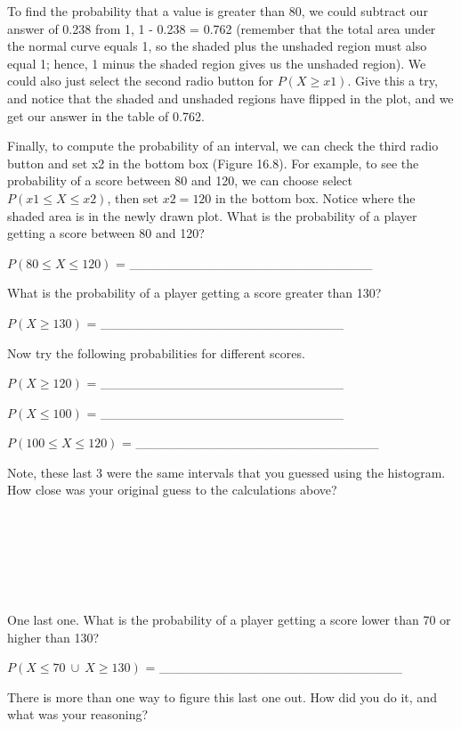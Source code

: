 \documentclass[
]{scrbook}
\begin{document}
To find the probability that a value is greater than 80, we could subtract our answer of 0.238 from 1, 1 - 0.238 = 0.762 (remember that the total area under the normal curve equals 1, so the shaded plus the unshaded region must also equal 1; hence, 1 minus the shaded region gives us the unshaded region).
We could also just select the second radio button for \(P(X \geq x1)\).
Give this a try, and notice that the shaded and unshaded regions have flipped in the plot, and we get our answer in the table of 0.762.

Finally, to compute the probability of an interval, we can check the third radio button and set x2 in the bottom box (Figure 16.8).
For example, to see the probability of a score between 80 and 120, we can choose select \(P(x1 \leq X \leq x2)\), then set \(x2 = 120\) in the bottom box.
Notice where the shaded area is in the newly drawn plot.
What is the probability of a player getting a score between 80 and 120?

\(P(80 \leq X \leq 120)\) = \_\_\_\_\_\_\_\_\_\_\_\_\_\_\_\_\_\_\_\_\_\_\_\_\_\_

What is the probability of a player getting a score greater than 130?

\(P(X \geq 130)\) = \_\_\_\_\_\_\_\_\_\_\_\_\_\_\_\_\_\_\_\_\_\_\_\_\_\_

Now try the following probabilities for different scores.

\(P(X \geq 120)\) = \_\_\_\_\_\_\_\_\_\_\_\_\_\_\_\_\_\_\_\_\_\_\_\_\_\_

\(P(X \leq 100)\) = \_\_\_\_\_\_\_\_\_\_\_\_\_\_\_\_\_\_\_\_\_\_\_\_\_\_

\(P(100 \leq X \leq 120)\) = \_\_\_\_\_\_\_\_\_\_\_\_\_\_\_\_\_\_\_\_\_\_\_\_\_\_

Note, these last 3 were the same intervals that you guessed using the histogram.
How close was your original guess to the calculations above?

\begin{verbatim}






\end{verbatim}

One last one.
What is the probability of a player getting a score lower than 70 or higher than 130?

\(P(X \leq 70 \: \cup \: X \geq 130)\) = \_\_\_\_\_\_\_\_\_\_\_\_\_\_\_\_\_\_\_\_\_\_\_\_\_\_

There is more than one way to figure this last one out.
How did you do it, and what was your reasoning?
\end{document}
